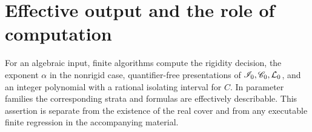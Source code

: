 \section{Effective output and the role of computation}\label{sec:effective}
\begin{theorem}\label{thm:effective}
For an algebraic input, finite algorithms compute the rigidity decision,
the exponent $\alpha$ in the nonrigid case, quantifier-free presentations
of $\mathscr I_0,\mathscr C_0,\mathcal L_0$, and an integer polynomial with a rational
isolating interval for $C$. In parameter families the corresponding
strata and formulas are effectively describable. This assertion is
separate from the existence of the real cover and from any executable
finite regression in the accompanying material.
\end{theorem}

